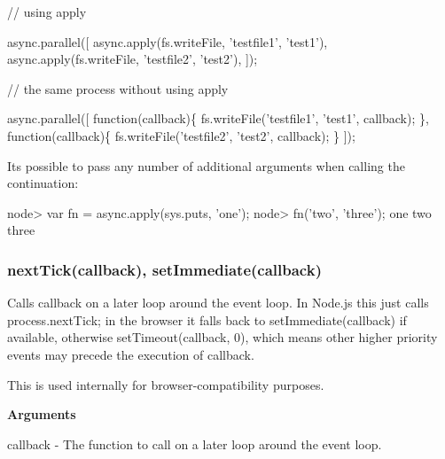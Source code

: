 \begin{DoxyCode}
\textcolor{comment}{// using apply}

async.parallel([
    async.apply(fs.writeFile, \textcolor{stringliteral}{'testfile1'}, \textcolor{stringliteral}{'test1'}),
    async.apply(fs.writeFile, \textcolor{stringliteral}{'testfile2'}, \textcolor{stringliteral}{'test2'}),
]);


\textcolor{comment}{// the same process without using apply}

async.parallel([
    \textcolor{keyword}{function}(callback)\{
        fs.writeFile(\textcolor{stringliteral}{'testfile1'}, \textcolor{stringliteral}{'test1'}, callback);
    \},
    \textcolor{keyword}{function}(callback)\{
        fs.writeFile(\textcolor{stringliteral}{'testfile2'}, \textcolor{stringliteral}{'test2'}, callback);
    \}
]);
\end{DoxyCode}


It\textquotesingle{}s possible to pass any number of additional arguments when calling the continuation\+:


\begin{DoxyCode}
node> var fn = async.apply(sys.puts, \textcolor{stringliteral}{'one'});
node> fn(\textcolor{stringliteral}{'two'}, \textcolor{stringliteral}{'three'});
one
two
three
\end{DoxyCode}
 



\label{_nextTick}%
 \subsubsection*{next\+Tick(callback), set\+Immediate(callback)}

Calls {\ttfamily callback} on a later loop around the event loop. In Node.\+js this just calls {\ttfamily process.\+next\+Tick}; in the browser it falls back to {\ttfamily set\+Immediate(callback)} if available, otherwise {\ttfamily set\+Timeout(callback, 0)}, which means other higher priority events may precede the execution of {\ttfamily callback}.

This is used internally for browser-\/compatibility purposes.

{\bfseries Arguments}


\begin{DoxyItemize}
\item {\ttfamily callback} -\/ The function to call on a later loop around the event loop.
\end{DoxyItemize}

